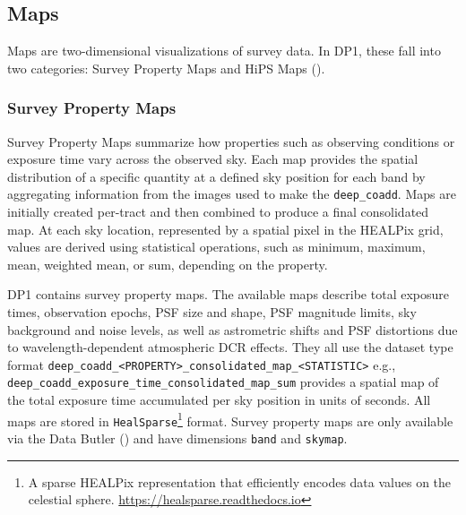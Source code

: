 


\subsection{Maps}
Maps are two-dimensional visualizations of survey data. 
In \gls{DP1}, these fall into two categories: Survey Property Maps and \gls{HiPS} Maps (\citealt{2015A&A...578A.114F}).

\subsubsection{Survey Property Maps}
Survey Property Maps \citep{10.71929/rubin/2570315} summarize how properties such as observing conditions or exposure time vary across the observed sky.
Each map provides the spatial distribution of a specific quantity at a defined sky position for each band by aggregating information from the images used to make the \texttt{deep\_coadd}.
Maps are initially created per-\gls{tract} and then combined to produce a final consolidated map.
At each sky location, represented by a spatial pixel in the \gls{HEALPix}\citep{2005ApJ...622..759G} grid, values are derived using statistical operations, such as minimum, maximum, mean, weighted mean, or sum, depending on the property.

DP1 contains \nsurveypropertymaps survey property maps.
The available maps describe total exposure times, observation epochs, \gls{PSF} size and \gls{shape}, \gls{PSF} magnitude limits, sky \gls{background} and noise levels, as well as astrometric shifts and \gls{PSF} distortions due to wavelength-dependent atmospheric \gls{DCR} effects.
They all use the dataset type  format \texttt{deep\_coadd\_<PROPERTY>\_consolidated\_map\_<STATISTIC>}
e.g., \texttt{deep\_coadd\_exposure\_time\_consolidated\_map\_sum} provides a spatial map of the total exposure time accumulated per
sky position in units of seconds.
All maps are stored in \texttt{HealSparse}\footnote{A sparse \gls{HEALPix}
representation that efficiently encodes data values on the celestial sphere. \url{https://healsparse.readthedocs.io}} format.
Survey property maps are only available via the Data \gls{Butler} () and  have dimensions \texttt{band} and \texttt{skymap}.

